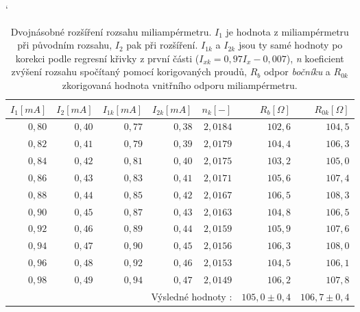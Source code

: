 \documentclass[english]{article}
\begin{document}
\begin{table}[h]
\catcode` %
\begin{center}
\begin{tabular}{|r|r|r|r|r|r|r|}
\hline
      $I_1 [mA]$ & $I_2 [mA]$ & $I_{1k} [mA]$ & $I_{2k} [mA]$ & $n_k [-]$ & $R_b [\Omega]$ & $R_{0k} [\Omega]$\\ \hline
      $0,80$ & $0,40$ & $0,77$ & $0,38$ & $2,0184$ & $102,6$ & $104,5$\\ \hline
      $0,82$ & $0,41$ & $0,79$ & $0,39$ & $2,0179$ & $104,4$ & $106,3$\\ \hline
      $0,84$ & $0,42$ & $0,81$ & $0,40$ & $2,0175$ & $103,2$ & $105,0$\\ \hline
      $0,86$ & $0,43$ & $0,83$ & $0,41$ & $2,0171$ & $105,6$ & $107,4$\\ \hline
      $0,88$ & $0,44$ & $0,85$ & $0,42$ & $2,0167$ & $106,5$ & $108,3$\\ \hline
      $0,90$ & $0,45$ & $0,87$ & $0,43$ & $2,0163$ & $104,8$ & $106,5$\\ \hline
      $0,92$ & $0,46$ & $0,89$ & $0,44$ & $2,0159$ & $105,9$ & $107,6$\\ \hline
      $0,94$ & $0,47$ & $0,90$ & $0,45$ & $2,0156$ & $106,3$ & $108,0$\\ \hline
      $0,96$ & $0,48$ & $0,92$ & $0,46$ & $2,0153$ & $104,5$ & $106,1$\\ \hline
      $0,98$ & $0,49$ & $0,94$ & $0,47$ & $2,0149$ & $106,2$ & $107,8$\\ \hline
      
      \multicolumn{2}{r|}{} & \multicolumn{3}{|r|}{Výsledné hodnoty \cite{bib:pra_chyby_o_2}:}  & $105,0 \pm 0,4$  & $106,7 \pm 0,4$ \\ 
      \cline{3-7} %
      
\end{tabular}
\caption{Dvojnásobné rozšíření rozsahu miliampérmetru. $I_1$ je hodnota z miliampérmetru při původním rozsahu, $I_2$ pak při rozšíření. $I_{1k}$ a $I_{2k}$ jsou ty samé hodnoty po korekci podle regresní křivky z první části ($I_{xk} = 0,97 I_x - 0,007$), \emph{n} koeficient zvýšení rozsahu spočítaný pomocí korigovaných proudů, $R_b$ odpor \emph{bočníku} a $R_{0k}$ zkorigovaná hodnota vnitřního odporu miliampérmetru.}
\label{tab:rozsirovani_ampermetru}
\end{center}
\end{table}
\end{document}
